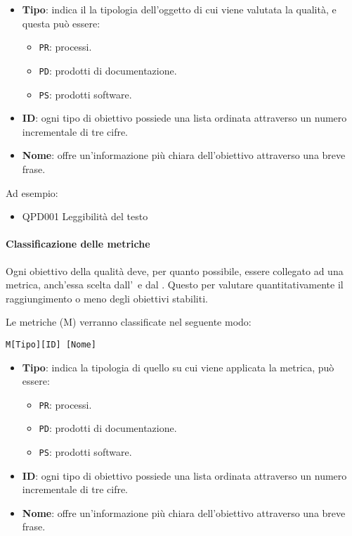 			\begin{itemize}
				\item \textbf{Tipo}: indica il la tipologia dell'oggetto di cui viene valutata la qualità, e questa può essere:
				\begin{itemize}
					\item \texttt{PR}: processi.
					\item \texttt{PD}: prodotti di documentazione.
					\item \texttt{PS}: prodotti software.
				\end{itemize}

				\item \textbf{ID}: ogni tipo di obiettivo possiede una lista ordinata attraverso un numero incrementale di tre cifre.
				\item \textbf{Nome}: offre un'informazione più chiara dell'obiettivo attraverso una breve frase.
			\end{itemize}

			Ad esempio:

			\begin{itemize}
				\item QPD001 Leggibilità del testo
			\end{itemize}


			\paragraph{Classificazione delle metriche}\label{Classificazione metriche}
			Ogni obiettivo della qualità deve, per quanto possibile, essere collegato ad una metrica, anch'essa scelta dall'\Amm\ e dal \Ver. Questo per valutare
			quantitativamente il raggiungimento o meno degli obiettivi stabiliti.

			Le metriche (M) verranno classificate nel seguente modo:

			\begin{center}
				\texttt{M[Tipo][ID] [Nome]}
			\end{center}

			\begin{itemize}
				\item \textbf{Tipo}: indica la tipologia di quello su cui viene applicata la metrica, può essere:
				\begin{itemize}
					\item \texttt{PR}: processi.
					\item \texttt{PD}: prodotti di documentazione.
					\item \texttt{PS}: prodotti software.
				\end{itemize}

				\item \textbf{ID}: ogni tipo di obiettivo possiede una lista ordinata attraverso un numero incrementale di tre cifre.
				\item \textbf{Nome}: offre un'informazione più chiara dell'obiettivo attraverso una breve frase.
			\end{itemize}

